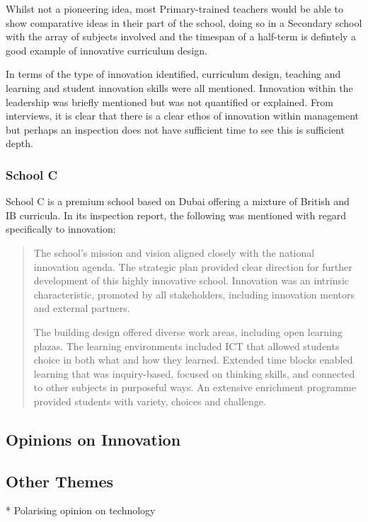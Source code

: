 Whilst not a pioneering idea, most Primary-trained teachers would be able to show comparative ideas in their part of the school, doing so in a Secondary school with the array of subjects involved and the timespan of a half-term is defintely a good example of innovative curriculum design.

In terms of the type of innovation identified, curriculum design, teaching and learning and student innovation skills were all mentioned. Innovation within the leadership was briefly mentioned but was not quantified or explained. From interviews, it is clear that there is a clear ethos of innovation within management but perhaps an inspection does not have sufficient time to see this is sufficient depth. 

\subsubsection{School C}
School C is a premium school based on Dubai offering a mixture of British and IB curricula. In its inspection report, the following was mentioned with regard specifically to innovation:

\begin{quote}
The school's mission and vision aligned closely with the national innovation agenda. The strategic plan provided clear direction for further development of this highly innovative school. Innovation was an intrinsic characteristic, promoted by all stakeholders, including innovation mentors and external partners.

The building design offered diverse work areas, including open learning plazas. The learning environments included ICT that allowed students choice in both what and how they learned. Extended time blocks enabled learning that was inquiry-based, focused on thinking skills, and connected to other subjects in purposeful ways. An extensive enrichment programme provided students with variety, choices and challenge.
\end{quote}

\subsection{Opinions on Innovation}


\subsection{Other Themes}
* Polarising opinion on technology

